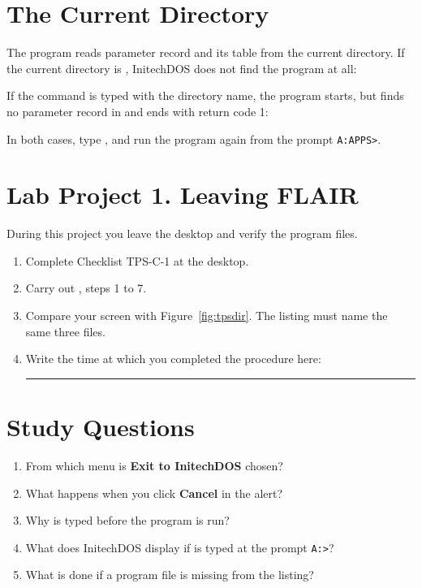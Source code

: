 \section{The Current Directory}
The program reads  parameter record and its table from the current
directory.  If the current directory is , InitechDOS does not
find the program at all:


If the command is typed with the directory name, the program starts, but
finds no parameter record in  and ends with return code 1:


In both cases, type , and run the program again from the
prompt \texttt{A:\bs APPS>}.

\section{Lab Project 1. Leaving FLAIR}
During this project you leave the desktop and verify the program files.
\begin{enumerate}
\item Complete Checklist TPS-C-1 at the desktop.
\item Carry out , steps 1 to 7.
\item Compare your screen with Figure~\ref{fig:tpsdir}.  The listing
  must name the same three files.
\item Write the time at which you completed the procedure here:
  \rule{30mm}{0.4pt}
\end{enumerate}

\section{Study Questions}
\begin{enumerate}
\item From which menu is \textbf{Exit to InitechDOS} chosen?
\item What happens when you click \textbf{Cancel} in the alert?
\item Why is  typed before the program is run?
\item What does InitechDOS display if  is typed at the
  prompt \texttt{A:\bs>}?
\item What is done if a program file is missing from the listing?
\end{enumerate}
